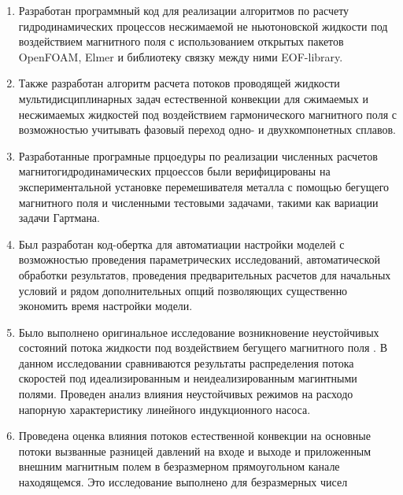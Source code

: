 {\novelty}
\begin{enumerate}[beginpenalty=10000] %
  
  \item Разработан программный код для реализации алгоритмов по расчету гидродинамических процессов  несжимаемой не  ньютоновской жидкости под воздействием магнитного поля с использованием открытых пакетов OpenFOAM, Elmer и библиотеку связку между ними EOF-library.
    
  \item Также разработан алгоритм расчета потоков проводящей жидкости мультидисциплинарных задач естественной конвекции для сжимаемых и несжимаемых жидкостей под воздействием гармонического магнитного поля с возможностью учитывать фазовый переход одно- и двухкомпонетных сплавов. 
  
  \item Разработанные програмные прцоедуры по реализации численных расчетов магнитогидродинамических прцоессов были верифицированы на экспериментальной установке перемешивателя металла с помощью бегущего магнитного поля и численными тестовыми задачами, такими как вариации задачи Гартмана. 
  
  \item Был разработан код-обертка для автоматиации настройки моделей с возможностью проведения параметрических исследований, автоматической обработки результатов, проведения предварительных расчетов для начальных условий и рядом дополнительных опций позволяющих существенно экономить время настройки модели. 
    
  \item Было выполнено оригинальное исследование возникновение неустойчивых состояний потока жидкости под воздействием бегущего магнитного поля 
  . В данном исследовании сравниваются результаты распределения потока скоростей под идеализированным и неидеализированным магинтными полями. Проведен анализ влияния неустойчивых режимов на расходо напорную характеристику линейного индукционного насоса. 
  
  \item Проведена оценка влияния потоков естественной конвекции на основные потоки вызванные разницей давлений на входе и выходе и приложенным внешним магнитным полем в безразмерном прямоугольном канале находящемся. Это исследование выполнено для безразмерных чисел  
  
   
\end{enumerate}


